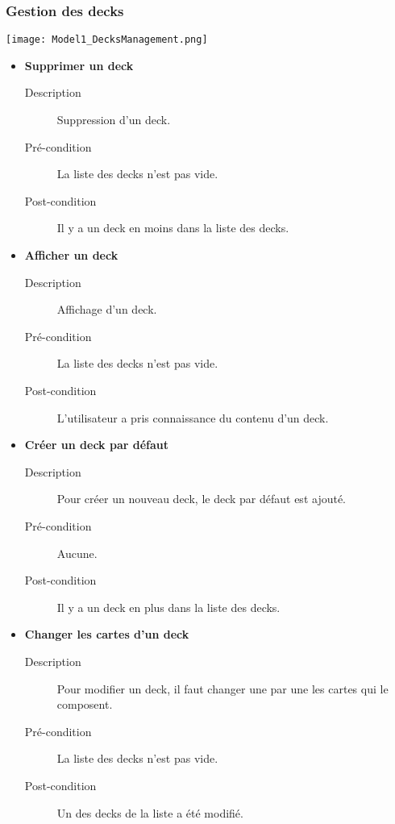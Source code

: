 \documentclass{article}
\begin{document}
		\subsubsection{Gestion des decks}
			\begin{center}\texttt{[image: Model1\_DecksManagement.png]}\end{center}
			\begin{itemize}
				\item \textbf{Supprimer un deck}
				\begin{description}
					\item[Description] Suppression d'un deck.
					\item[Pré-condition] La liste des decks n'est pas vide.
					\item[Post-condition] Il y a un deck en moins dans la liste des decks.\\
				\end{description}

				\item \textbf{Afficher un deck}
				\begin{description}
					\item[Description] Affichage d'un deck.
					\item[Pré-condition] La liste des decks n'est pas vide.
					\item[Post-condition] L'utilisateur a pris connaissance du contenu d'un deck.\\
				\end{description}

				\item \textbf{Créer un deck par défaut}
				\begin{description}
					\item[Description] Pour créer un nouveau deck, le deck par défaut est ajouté.
					\item[Pré-condition] Aucune.
					\item[Post-condition] Il y a un deck en plus dans la liste des decks.\\
				\end{description}

				\item \textbf{Changer les cartes d'un deck}
				\begin{description}
					\item[Description] Pour modifier un deck, il faut changer une par une les cartes qui le composent.
					\item[Pré-condition] La liste des decks n'est pas vide.
					\item[Post-condition] Un des decks de la liste a été modifié.\\
				\end{description}
			\end{itemize}
\end{document}
